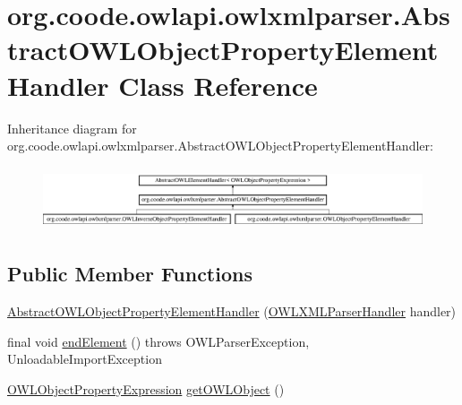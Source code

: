 \hypertarget{classorg_1_1coode_1_1owlapi_1_1owlxmlparser_1_1_abstract_o_w_l_object_property_element_handler}{\section{org.\-coode.\-owlapi.\-owlxmlparser.\-Abstract\-O\-W\-L\-Object\-Property\-Element\-Handler Class Reference}
\label{classorg_1_1coode_1_1owlapi_1_1owlxmlparser_1_1_abstract_o_w_l_object_property_element_handler}
}
Inheritance diagram for org.\-coode.\-owlapi.\-owlxmlparser.\-Abstract\-O\-W\-L\-Object\-Property\-Element\-Handler\-:\begin{figure}[H]
\begin{center}
\leavevmode
\includegraphics[height=1.866667cm]{classorg_1_1coode_1_1owlapi_1_1owlxmlparser_1_1_abstract_o_w_l_object_property_element_handler}
\end{center}
\end{figure}
\subsection*{Public Member Functions}
\begin{DoxyCompactItemize}
\item 
\hyperlink{classorg_1_1coode_1_1owlapi_1_1owlxmlparser_1_1_abstract_o_w_l_object_property_element_handler_ac502141330af7e831f7d3c52f1e5aea6}{Abstract\-O\-W\-L\-Object\-Property\-Element\-Handler} (\hyperlink{classorg_1_1coode_1_1owlapi_1_1owlxmlparser_1_1_o_w_l_x_m_l_parser_handler}{O\-W\-L\-X\-M\-L\-Parser\-Handler} handler)
\item 
final void \hyperlink{classorg_1_1coode_1_1owlapi_1_1owlxmlparser_1_1_abstract_o_w_l_object_property_element_handler_afcdbfac1789262629a551f6376299437}{end\-Element} ()  throws O\-W\-L\-Parser\-Exception, Unloadable\-Import\-Exception 
\item 
\hyperlink{interfaceorg_1_1semanticweb_1_1owlapi_1_1model_1_1_o_w_l_object_property_expression}{O\-W\-L\-Object\-Property\-Expression} \hyperlink{classorg_1_1coode_1_1owlapi_1_1owlxmlparser_1_1_abstract_o_w_l_object_property_element_handler_ab4b35b1f0350f8317e1b3ac8f4d6a705}{get\-O\-W\-L\-Object} ()
\end{DoxyCompactItemize}
